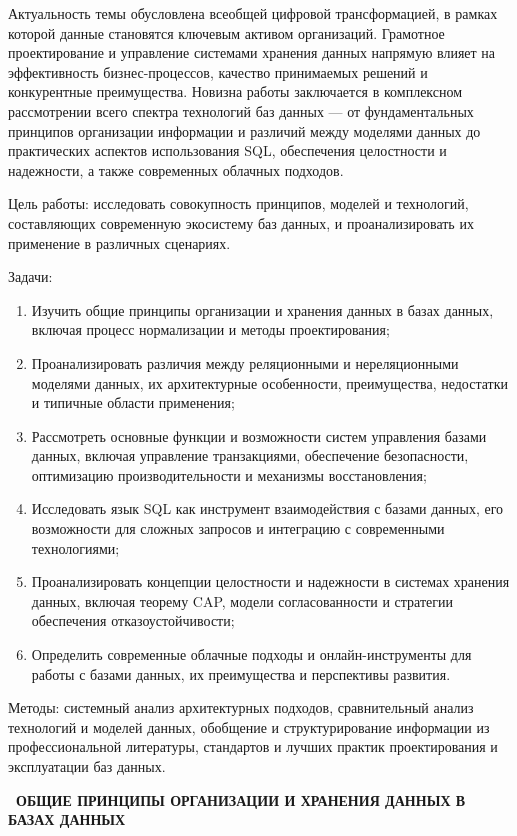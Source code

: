 \documentclass{SibFU-docs}
\begin{document}
Актуальность темы обусловлена всеобщей цифровой трансформацией, в рамках которой данные становятся ключевым активом организаций. Грамотное проектирование и управление системами хранения данных напрямую влияет на эффективность бизнес-процессов, качество принимаемых решений и конкурентные преимущества. Новизна работы заключается в комплексном рассмотрении всего спектра технологий баз данных — от фундаментальных принципов организации информации и различий между моделями данных до практических аспектов использования SQL, обеспечения целостности и надежности, а также современных облачных подходов.

Цель работы: исследовать совокупность принципов, моделей и технологий, составляющих современную экосистему баз данных, и проанализировать их применение в различных сценариях.

Задачи:
\begin{enumerate}
\item Изучить общие принципы организации и хранения данных в базах данных, включая процесс нормализации и методы проектирования;
\item Проанализировать различия между реляционными и нереляционными моделями данных, их архитектурные особенности, преимущества, недостатки и типичные области применения;
\item Рассмотреть основные функции и возможности систем управления базами данных, включая управление транзакциями, обеспечение безопасности, оптимизацию производительности и механизмы восстановления;
\item Исследовать язык SQL как инструмент взаимодействия с базами данных, его возможности для сложных запросов и интеграцию с современными технологиями;
\item Проанализировать концепции целостности и надежности в системах хранения данных, включая теорему CAP, модели согласованности и стратегии обеспечения отказоустойчивости;
\item Определить современные облачные подходы и онлайн-инструменты для работы с базами данных, их преимущества и перспективы развития.
\end{enumerate}

Методы: системный анализ архитектурных подходов, сравнительный анализ технологий и моделей данных, обобщение и структурирование информации из профессиональной литературы, стандартов и лучших практик проектирования и эксплуатации баз данных.

\newpage
\vspace*{-2.5em}
\begin{center}\textbf{\thesection\ ОБЩИЕ ПРИНЦИПЫ ОРГАНИЗАЦИИ И ХРАНЕНИЯ ДАННЫХ В БАЗАХ ДАННЫХ}\end{center}
\vspace*{-1.5em}
\end{document}
